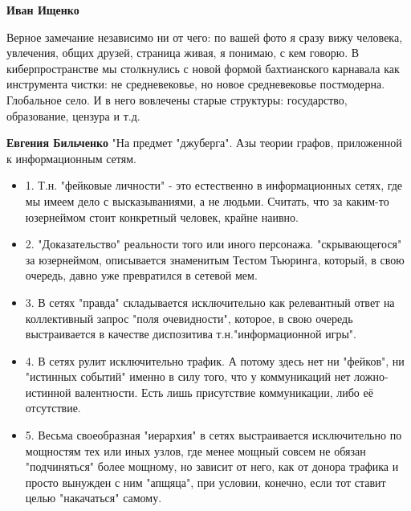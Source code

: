\begin{itemize}
\begin{itemize}
 

\textbf{Иван Ищенко} 

Верное замечание независимо ни от чего: по вашей фото я сразу вижу человека,
увлечения, общих друзей, страница живая, я понимаю, с кем говорю. В
киберпространстве мы столкнулись с новой формой бахтианского карнавала как
инструмента чистки: не средневековье, но новое средневековье постмодерна.
Глобальное село. И в него вовлечены старые структуры: государство, образование,
цензура и т.д.


 
\textbf{Евгения Бильченко} "На предмет "джуберга". Азы теории графов, приложенной к информационным сетям.

\begin{itemize}
\item 1. Т.н. "фейковые личности" - это естественно в информационных сетях, где мы
имеем дело с высказываниями, а не людьми. Считать, что за каким-то юзернеймом
стоит конкретный человек, крайне наивно.

\item 2. "Доказательство" реальности того или иного персонажа. "скрывающегося" за
юзернеймом, описывается знаменитым Тестом Тьюринга, который, в свою очередь,
давно уже превратился в сетевой мем.

\item 3. В сетях "правда" складывается исключительно как релевантный ответ на
коллективный запрос "поля очевидности", которое, в свою очередь выстраивается в
качестве диспозитива т.н."информационной игры".

\item 4. В сетях рулит исключительно трафик. А потому здесь нет ни "фейков", ни
"истинных событий" именно в силу того, что у коммуникаций нет ложно-истинной
валентности. Есть лишь присутствие коммуникации, либо её отсутствие.

\item 5. Весьма своеобразная "иерархия" в сетях выстраивается исключительно по
мощностям тех или иных узлов, где менее мощный совсем не обязан "подчиняться"
более мощному, но зависит от него, как от донора трафика и просто вынужден с
ним "апщяца", при условии, конечно, если тот ставит целью "накачаться" самому.


\end{itemize}
\end{itemize}
\end{itemize}
